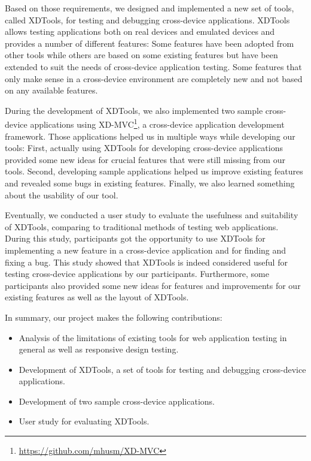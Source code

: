 Based on those requirements, we designed and implemented a new set of tools, called XDTools, for testing and debugging cross-device applications. XDTools allows testing applications both on real devices and emulated devices and provides a number of different features: Some features have been adopted from other tools while others are based on some existing features but have been extended to suit the needs of cross-device application testing. Some features that only make sense in a cross-device environment are completely new and not based on any available features.

During the development of XDTools, we also implemented two sample cross-device applications using XD-MVC\footnote{\url{https://github.com/mhusm/XD-MVC}}, a cross-device application development framework. Those applications helped us in multiple ways while developing our tools: First, actually using XDTools for developing cross-device applications provided some new ideas for crucial features that were still missing from our tools. Second, developing sample applications helped us improve existing features and revealed some bugs in existing features. Finally, we also learned something about the usability of our tool.

Eventually, we conducted a user study to evaluate the usefulness and suitability of XDTools, comparing to traditional methods of testing web applications. During this study, participants got the opportunity to use XDTools for implementing a new feature in a cross-device application and for finding and fixing a bug. This study showed that XDTools is indeed considered useful for testing cross-device applications by our participants. Furthermore, some participants also provided some new ideas for features and improvements for our existing features as well as the layout of XDTools.

In summary, our project makes the following contributions:
\begin{itemize}
	\item Analysis of the limitations of existing tools for web application testing in general as well as responsive design testing.
	\item Development of XDTools, a set of tools for testing and debugging cross-device applications.
	\item Development of two sample cross-device applications.
	\item User study for evaluating XDTools.
\end{itemize}


